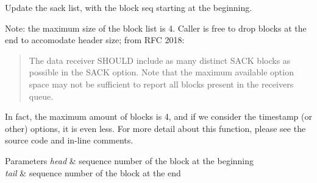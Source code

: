 Update the sack list, with the block seq starting at the beginning. 

Note\+: the maximum size of the block list is 4. Caller is free to drop blocks at the end to accomodate header size; from R\+FC 2018\+:

\begin{quote}
The data receiver S\+H\+O\+U\+LD include as many distinct S\+A\+CK blocks as possible in the S\+A\+CK option. Note that the maximum available option space may not be sufficient to report all blocks present in the receiver\textquotesingle{}s queue. \end{quote}


In fact, the maximum amount of blocks is 4, and if we consider the timestamp (or other) options, it is even less. For more detail about this function, please see the source code and in-\/line comments.


\begin{DoxyParams}{Parameters}
{\em head} & sequence number of the block at the beginning \\
\hline
{\em tail} & sequence number of the block at the end \\
\hline
\end{DoxyParams}

